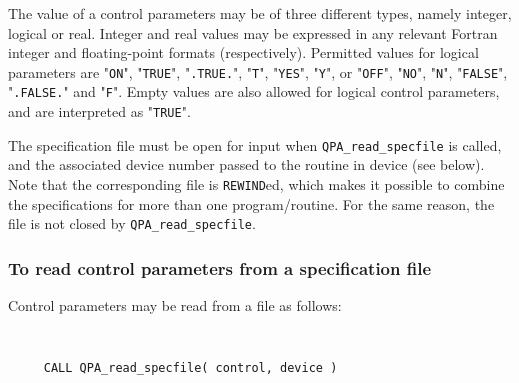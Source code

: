 \documentclass{galahad}
\newcommand{\packagename}{QPA}
\begin{document}
The value of a control parameters may be of three different types, namely
integer, logical or real.
Integer and real values may be expressed in any relevant Fortran integer and
floating-point formats (respectively). Permitted values for logical
parameters are "{\tt ON}", "{\tt TRUE}", "{\tt .TRUE.}", "{\tt T}", 
"{\tt YES}", "{\tt Y}", or "{\tt OFF}", "{\tt NO}",
"{\tt N}", "{\tt FALSE}", "{\tt .FALSE.}" and "{\tt F}". 
Empty values are also allowed for 
logical control parameters, and are interpreted as "{\tt TRUE}".  

The specification file must be open for 
input when {\tt \packagename\_read\_specfile}
is called, and the associated device number 
passed to the routine in device (see below). 
Note that the corresponding 
file is {\tt REWIND}ed, which makes it possible to combine the specifications 
for more than one program/routine.  For the same reason, the file is not
closed by {\tt \packagename\_read\_specfile}.

\subsubsection{To read control parameters from a specification file}
\label{readspec}

Control parameters may be read from a file as follows:
\hskip0.5in 
\def\baselinestretch{0.8} {\tt 
\begin{verbatim}
     CALL QPA_read_specfile( control, device )
\end{verbatim}}
\def\baselinestretch{1.0}
\end{document}
